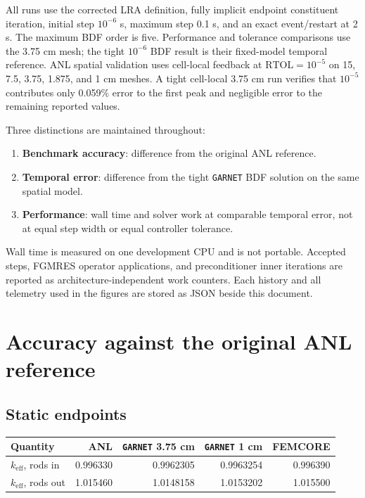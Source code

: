 \documentclass[10pt]{article}
\newcommand{\garnet}{\texttt{GARNET}}
\begin{document}
All runs use the corrected LRA definition, fully implicit endpoint constituent
iteration, initial step $10^{-6}$ s, maximum step 0.1 s, and an exact
event/restart at 2 s. The maximum BDF order is five. Performance and tolerance
comparisons use the 3.75 cm mesh; the tight $10^{-6}$ BDF result is their
fixed-model temporal reference. ANL spatial validation uses cell-local feedback
at $\mathrm{RTOL}=10^{-5}$ on 15, 7.5, 3.75, 1.875, and 1 cm meshes. A tight
cell-local 3.75 cm run verifies that $10^{-5}$ contributes only 0.059\% error
to the first peak and negligible error to the remaining reported values.

Three distinctions are maintained throughout:
\begin{enumerate}
\item \textbf{Benchmark accuracy}: difference from the original ANL reference.
\item \textbf{Temporal error}: difference from the tight \garnet{} BDF solution
  on the same spatial model.
\item \textbf{Performance}: wall time and solver work at comparable temporal
  error, not at equal step width or equal controller tolerance.
\end{enumerate}

Wall time is measured on one development CPU and is not portable. Accepted
steps, FGMRES operator applications, and preconditioner inner iterations are
reported as architecture-independent work counters. Each history and all
telemetry used in the figures are stored as JSON beside this document.

\section{Accuracy against the original ANL reference}

\subsection{Static endpoints}

\begin{center}
\begin{tabular}{|l|r|r|r|r|}
\hline
Quantity & ANL & \garnet{} 3.75 cm & \garnet{} 1 cm & FEMCORE \\
\hline
$k_{\mathrm{eff}}$, rods in  & 0.996330 & 0.9962305 & 0.9963254 & 0.996390 \\
$k_{\mathrm{eff}}$, rods out & 1.015460 & 1.0148158 & 1.0153202 & 1.015500 \\
\hline
\end{tabular}
\end{center}
\end{document}
